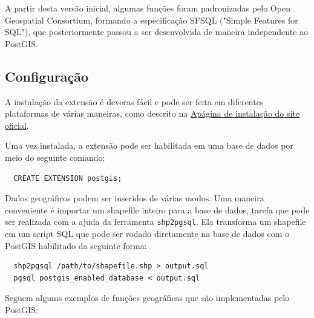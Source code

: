 \documentclass[12pt]{article}
\begin{document}
A partir desta versão inicial, algumas funções foram padronizadas pelo Open
Geospatial Consortium, formando a especificação SFSQL ("Simple Features for
SQL"), que posteriormente passou a ser desenvolvida de maneira independente ao
PostGIS.

\subsection{Configuração}

A instalação da extensão é deveras fácil e pode ser feita em diferentes
plataformas de várias maneiras, como descrito na
\href{http://postgis.net/install}{Apágina de instalação do site oficial}.

Uma vez instalada, a extensão pode ser habilitada em uma base de dados por meio
do seguinte comando:

\begin{verbatim}
  CREATE EXTENSION postgis;
\end{verbatim}

Dados geográficos podem ser inseridos de várias modos. Uma maneira conveniente
é importar um shapefile inteiro para a base de dados, tarefa que pode ser
realizada com a ajuda da ferramenta \texttt{shp2pgsql}. Ela transforma um
shapefile em um script SQL que pode ser rodado diretamente na base de dados com
o PostGIS habilitado da seguinte forma:

\begin{verbatim}
  shp2pgsql /path/to/shapefile.shp > output.sql
  pgsql postgis_enabled_database < output.sql
\end{verbatim}

Seguem algums exemplos de funções geográficas que são implementadas pelo
PostGIS:
\end{document}
